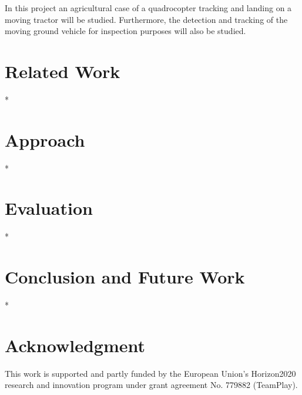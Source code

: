 \documentclass[conference]{IEEEtran}
\begin{document}

In this project
an agricultural case of a quadrocopter tracking and landing on a moving tractor will be studied. Furthermore, the detection and tracking of the moving ground vehicle for inspection purposes will also be studied.

\section{Related Work}
\label{sec:related}

*

\section{Approach}
\label{sec:approach}

*

\section{Evaluation}
\label{sec:experimental}

*

\section{Conclusion and Future Work}
\label{sec:conclusion}

*

\section*{Acknowledgment}

This work is supported and partly funded by the European Union’s Horizon2020 research and innovation program under grant agreement No. 779882 (TeamPlay).


 
\vspace{1ex}
\end{document}
